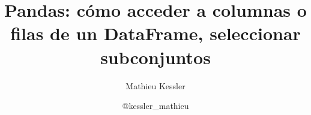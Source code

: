 \documentclass[9pt]{beamer}
\begin{document}
\title{Pandas: cómo acceder a columnas o filas de un DataFrame, seleccionar subconjuntos}

\author[Mathieu Kessler]{Mathieu Kessler}
\date{@kessler\_mathieu}{}%

\begin{frame}
  \titlepage
\end{frame}
\end{document}
